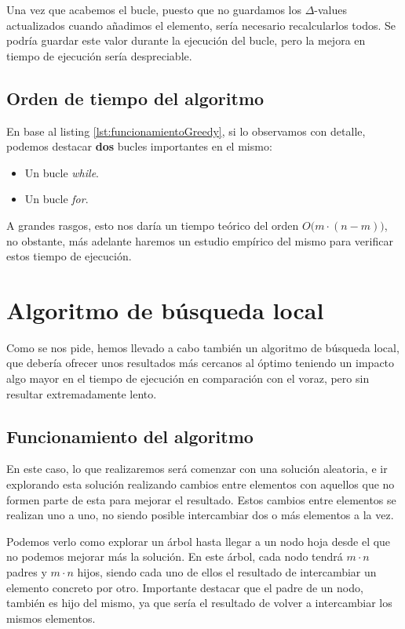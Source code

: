 Una vez que acabemos el bucle, puesto que no guardamos los $\Delta$-values actualizados cuando añadimos el elemento, sería necesario recalcularlos todos. Se podría guardar este valor durante la ejecución del bucle, pero la mejora en tiempo de ejecución sería despreciable.

\subsection{Orden de tiempo del algoritmo}

En base al listing \ref{lst:funcionamientoGreedy}, si lo observamos con detalle, podemos destacar \textbf{dos} bucles importantes en el mismo:

\begin{itemize}
\item Un bucle \textit{while}.
\item Un bucle \textit{for}.
\end{itemize}

A grandes rasgos, esto nos daría un tiempo teórico del orden $\displaystyle O \Big( m\cdot(n-m) \Big)$, no obstante, más adelante haremos un estudio empírico del mismo para verificar estos tiempo de ejecución.

\newpage

\section{Algoritmo de búsqueda local}

Como se nos pide, hemos llevado a cabo también un algoritmo de búsqueda local, que debería ofrecer unos resultados más cercanos al óptimo teniendo un impacto algo mayor en el tiempo de ejecución en comparación con el voraz, pero sin resultar extremadamente lento.

\subsection{Funcionamiento del algoritmo}

En este caso, lo que realizaremos será comenzar con una solución aleatoria, e ir explorando esta solución realizando cambios entre elementos con aquellos que no formen parte de esta para mejorar el resultado. Estos cambios entre elementos se realizan uno a uno, no siendo posible intercambiar dos o más elementos a la vez.

Podemos verlo como explorar un árbol hasta llegar a un nodo hoja desde el que no podemos mejorar más la solución. En este árbol, cada nodo tendrá $m \cdot n$ padres y $m \cdot n$ hijos, siendo cada uno de ellos el resultado de intercambiar un elemento concreto por otro. Importante destacar que el padre de un nodo, también es hijo del mismo, ya que sería el resultado de volver a intercambiar los mismos elementos.

